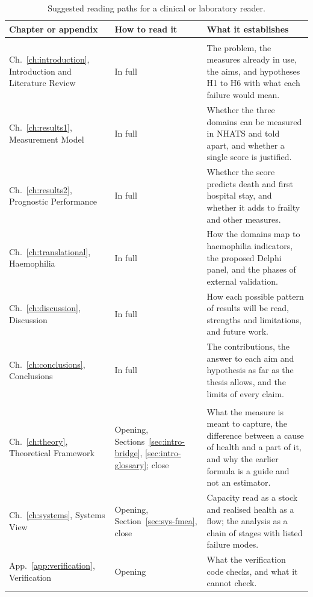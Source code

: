 \begin{table}[htbp]
\centering
\caption{Suggested reading paths for a clinical or laboratory reader.}
\label{tab:guide-paths}
\footnotesize
\setlength{\tabcolsep}{4pt}
\renewcommand{\arraystretch}{1.05}
\begin{tabular}{>{\raggedright\arraybackslash}p{3.3cm} >{\raggedright\arraybackslash}p{2.8cm} >{\raggedright\arraybackslash}p{8.6cm}}
\toprule
\textbf{Chapter or appendix} & \textbf{How to read it} & \textbf{What it establishes} \\
\midrule
\multicolumn{3}{l}{\textit{Read in full}} \\
Ch.~\ref{ch:introduction}, Introduction and Literature Review & In full & The problem, the measures already in use, the aims, and hypotheses H1 to H6 with what each failure would mean. \\
Ch.~\ref{ch:results1}, Measurement Model & In full & Whether the three domains can be measured in NHATS and told apart, and whether a single score is justified. \\
Ch.~\ref{ch:results2}, Prognostic Performance & In full & Whether the score predicts death and first hospital stay, and whether it adds to frailty and other measures. \\
Ch.~\ref{ch:translational}, Haemophilia & In full & How the domains map to haemophilia indicators, the proposed Delphi panel, and the phases of external validation. \\
Ch.~\ref{ch:discussion}, Discussion & In full & How each possible pattern of results will be read, strengths and limitations, and future work. \\
Ch.~\ref{ch:conclusions}, Conclusions & In full & The contributions, the answer to each aim and hypothesis as far as the thesis allows, and the limits of every claim. \\
\midrule
\multicolumn{3}{l}{\textit{Read the opening and closing sections}} \\
Ch.~\ref{ch:theory}, Theoretical Framework & Opening, Sections~\ref{sec:intro-bridge}, \ref{sec:intro-glossary}; close & What the measure is meant to capture, the difference between a cause of health and a part of it, and why the earlier formula is a guide and not an estimator. \\
Ch.~\ref{ch:systems}, Systems View & Opening, Section~\ref{sec:sys-fmea}, close & Capacity read as a stock and realised health as a flow; the analysis as a chain of stages with listed failure modes. \\
App.~\ref{app:verification}, Verification & Opening & What the verification code checks, and what it cannot check. \\

\end{tabular}
\end{table}
